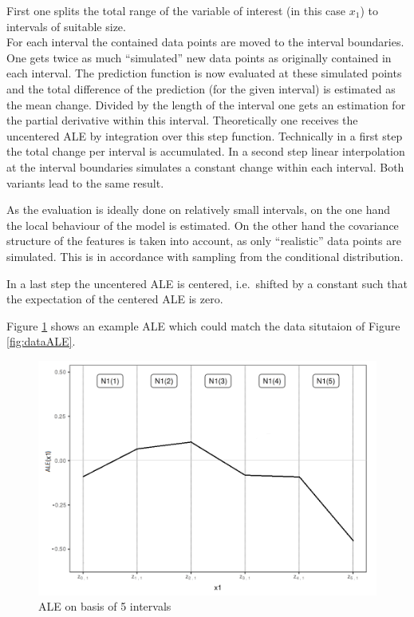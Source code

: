 \documentclass[]{krantz}
\begin{document}
First one splits the total range of the variable of interest (in this
case \(x_1\)) to intervals of suitable size.\\
For each interval the contained data points are moved to the interval
boundaries. One gets twice as much ``simulated'' new data points as
originally contained in each interval. The prediction function is now
evaluated at these simulated points and the total difference of the
prediction (for the given interval) is estimated as the mean change.
Divided by the length of the interval one gets an estimation for the
partial derivative within this interval. Theoretically one receives the
uncentered ALE by integration over this step function. Technically in a
first step the total change per interval is accumulated. In a second
step linear interpolation at the interval boundaries simulates a
constant change within each interval. Both variants lead to the same
result.

As the evaluation is ideally done on relatively small intervals, on the
one hand the local behaviour of the model is estimated. On the other
hand the covariance structure of the features is taken into account, as
only ``realistic'' data points are simulated. This is in accordance with
sampling from the conditional distribution.

In a last step the uncentered ALE is centered, i.e.~shifted by a
constant such that the expectation of the centered ALE is zero.

Figure \ref{fig:aleEx} shows an example ALE which could match the data
situtaion of Figure \ref{fig:dataALE}.

\begin{figure}
\includegraphics[width=1\linewidth]{images/ale_example} \caption{ALE on basis of 5 intervals}\label{fig:aleEx}
\end{figure}
\end{document}
